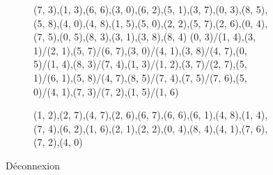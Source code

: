 \begin{figure}
  \centering
  \begin{subfigure}[b]{0.40\textwidth}
    \resizebox{\linewidth}{!} {
       {{(7, 3),(1, 3),(6, 6),(3, 0),(6, 2),(5, 1),(3, 7),(0,
      3),(8, 5),(5, 8),(4, 0),(4, 8),(1, 5),(5, 0),(2, 2),(5, 7),(2, 6),(0,
      4),(7, 5),(0, 5),(8, 3),(3, 1),(3, 8),(8, 4)}} {{{(0, 3)/(1, 4)},{(3,
      1)/(2, 1)},{(5, 7)/(6, 7)},{(3, 0)/(4, 1)},{(3, 8)/(4, 7)},{(0, 5)/(1,
      4)},{(8, 3)/(7, 4)},{(1, 3)/(1, 2)},{(3, 7)/(2, 7)},{(5, 1)/(6, 1)},{(5,
      8)/(4, 7)},{(8, 5)/(7, 4)},{(7, 5)/(7, 6)},{(5, 0)/(4, 1)},{(7, 3)/(7,
      2)},{(1, 5)/(1, 6)}}}
    }
  \end{subfigure}
  \begin{subfigure}[b]{0.40\textwidth}
    \resizebox{\linewidth}{!} {
       {{(1, 2),(2, 7),(4, 7),(2, 6),(6, 7),(6, 6),(6, 1),(4,
      8),(1, 4),(7, 4),(6, 2),(1, 6),(2, 1),(2, 2),(0, 4),(8, 4),(4, 1),(7,
      6),(7, 2),(4, 0)}} {{}}
    }
  \end{subfigure}
  \caption{Déconnexion}
\end{figure}

